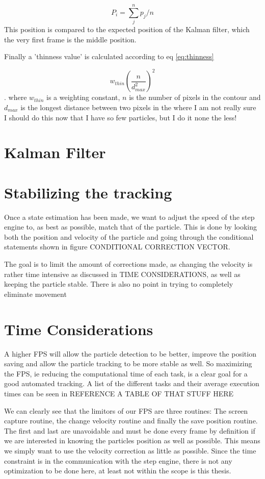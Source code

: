 \documentclass[]{report}
\begin{document}
\[
P_i = \sum_{j}^n p_j/n
\]
This position is compared to the expected position of the Kalman filter, which the very first frame is the middle position. 

Finally a 'thinness value' is calculated according to eq \ref{eq:thinness}

\begin{equation}\label{eq:thinness}
w_{thin}\left(\frac{ n}{d_{max}^2}\right)^2
\end{equation}. 
where $w_{thin}$ is a weighting constant, $n$ is the number of pixels in the contour and $d_{max}$ is the longest distance between two pixels in the 
where I am not really sure I should do this now that I have so few particles, but I do it none the less!

\section{Kalman Filter}


\section{Stabilizing the tracking}
Once a state estimation has been made, we want to adjust the speed of the step engine to, as best as possible, match that of the particle. This is done by looking both the position and velocity of the particle and going through the conditional statements shown in figure CONDITIONAL CORRECTION VECTOR. 

The goal is to limit the amount of corrections made, as changing the velocity is rather time intensive as discussed in TIME CONSIDERATIONS, as well as keeping the particle stable. There is also no point in trying to completely eliminate movement

\section{Time Considerations}
A higher FPS will allow the particle detection to be better, improve the position saving and allow the particle tracking to be more stable as well. So maximizing the FPS, ie reducing the computational time of each task, is a clear goal for a good automated tracking. A list of the different tasks and their average execution times can be seen in REFERENCE A TABLE OF THAT STUFF HERE

We can clearly see that the limitors of our FPS are three routines: The screen capture routine, the change velocity routine and finally the save position routine. The first and last are unavoidable and must be done every frame by definition if we are interested in knowing the particles position as well as possible. This means we simply want to use the velocity correction as little as possible. Since the time constraint is in the communication with the step engine, there is not any optimization to be done here, at least not within the scope is this thesis. 
\end{document}
